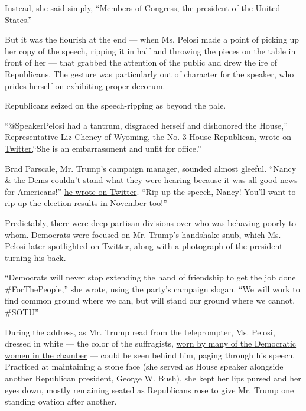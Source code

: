 Instead, she said simply, ``Members of Congress, the president of the
United States.''

But it was the flourish at the end --- when Ms. Pelosi made a point of
picking up her copy of the speech, ripping it in half and throwing the
pieces on the table in front of her --- that grabbed the attention of
the public and drew the ire of Republicans. The gesture was particularly
out of character for the speaker, who prides herself on exhibiting
proper decorum.

Republicans seized on the speech-ripping as beyond the pale.

``@SpeakerPelosi had a tantrum, disgraced herself and dishonored the
House,'' Representative Liz Cheney of Wyoming, the No. 3 House
Republican,
\href{https://twitter.com/Liz_Cheney/status/1224902093380648960}{wr}\href{https://twitter.com/Liz_Cheney/status/1224902093380648960?s=20}{ote
on Twitter.}``She is an embarrassment and unfit for office.''

Brad Parscale, Mr. Trump's campaign manager, sounded almost gleeful.
``Nancy \& the Dems couldn't stand what they were hearing because it was
all good news for Americans!''
\href{https://twitter.com/parscale/status/1224901504236228608}{he wrote
on Twitter}. ``Rip up the speech, Nancy! You'll want to rip up the
election results in November too!''

Predictably, there were deep partisan divisions over who was behaving
poorly to whom. Democrats were focused on Mr. Trump's handshake snub,
which
\href{https://twitter.com/speakerpelosi/status/1224907608982802433}{Ms.
Pelosi later spotlighted on Twitter}, along with a photograph of the
president turning his back.

``Democrats will never stop extending the hand of friendship to get the
job done
\href{https://twitter.com/hashtag/ForThePeople?src=hashtag_click}{\#ForThePeople},''
she wrote, using the party's campaign slogan. ``We will work to find
common ground where we can, but will stand our ground where we cannot.
\#SOTU''

During the address, as Mr. Trump read from the teleprompter, Ms. Pelosi,
dressed in white --- the color of the suffragists,
\href{https://www.nytimes.com/2020/02/04/us/politics/women-in-white-state-of-the-union.html}{worn
by many of the Democratic women in the chamber} --- could be seen behind
him, paging through his speech. Practiced at maintaining a stone face
(she served as House speaker alongside another Republican president,
George W. Bush), she kept her lips pursed and her eyes down, mostly
remaining seated as Republicans rose to give Mr. Trump one standing
ovation after another.

